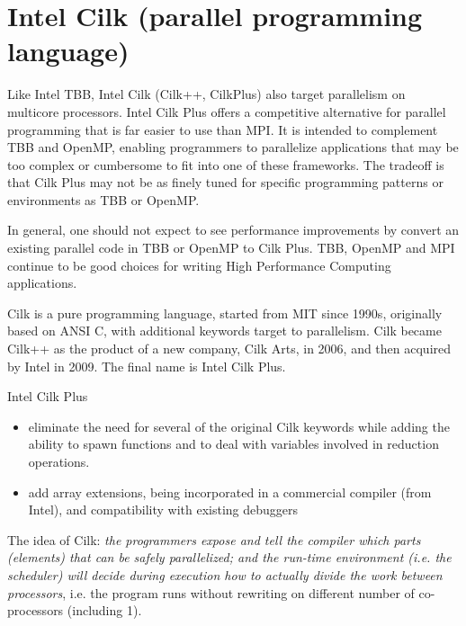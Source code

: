 \chapter[Intel Cilk]{Intel Cilk (parallel programming language)}
\label{chap:Intel_Cilk}

Like Intel TBB, Intel Cilk (Cilk++, CilkPlus) also target parallelism on
multicore processors. Intel Cilk Plus offers a competitive alternative for
parallel programming that is far easier to use than MPI.  
It is intended to complement TBB and OpenMP, enabling programmers to parallelize
applications that may be too complex or cumbersome to fit into one of these frameworks.
The tradeoff is that Cilk Plus may not be as finely tuned for specific
programming patterns or environments as TBB or OpenMP. 

\begin{mdframed}

In general, one should not expect to see performance improvements by convert an
existing parallel code in TBB or OpenMP to Cilk Plus.   TBB, OpenMP and MPI
continue to be good choices for writing High Performance Computing applications.

\end{mdframed}

Cilk is a pure programming language, started from MIT since 1990s, originally
based on ANSI C, with additional keywords target to parallelism.
Cilk became Cilk++ as the product of a new company, Cilk Arts, in 2006, and then
acquired by Intel in 2009. The final name is Intel Cilk Plus.

Intel Cilk Plus 
\begin{itemize}
  \item  eliminate the need for several of the original Cilk keywords while adding the
ability to spawn functions and to deal with variables involved in reduction operations.

  \item add array extensions, being incorporated in a commercial compiler (from
Intel), and compatibility with existing debuggers
  
\end{itemize}

The idea of Cilk: {\it the programmers expose and tell the compiler which parts
(elements) that can be safely parallelized; and the run-time environment (i.e.
the scheduler) will decide during execution how to actually divide the work
between processors}, i.e. the program runs without rewriting on different number
of co-processors (including 1).

